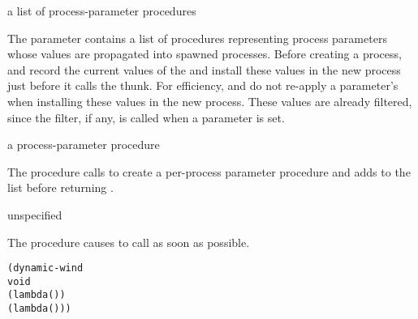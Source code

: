 \begin{parameter}
\end{parameter}
\hasvalue{} a list of process-parameter procedures

The  parameter contains a list of procedures
representing process parameters whose values are propagated into spawned
processes.
Before creating a process,  and 
record the current values of the 
and install these values in the new process just before it calls
the thunk.
For efficiency,  and  do not re-apply a
parameter's  when installing these values in the new process.
These values are already filtered, since the filter, if any, is called
when a parameter is set.

\begin{procedure}
\end{procedure}
\returns{} a process-parameter procedure

The  procedure calls
 to create a per-process
parameter procedure  and adds  to the
 list before returning .

\begin{procedure}
\end{procedure}
\returns{} unspecified

The  procedure causes  to call
 as soon as possible.

\begin{syntax}
\end{syntax}
\expandsto{}\begin{alltt}\antipar
(dynamic-wind
  void
  (lambda ()   \etc{})
  (lambda () ))\end{alltt}

